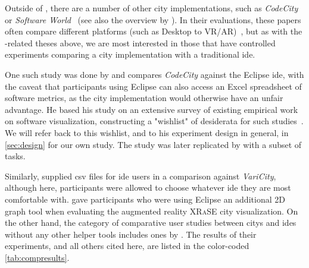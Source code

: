 \documentclass[../thesis]{subfiles}
\begin{document}
Outside of \SEE{}, there are a number of other \gls{city} implementations, such as \emph{CodeCity}~\cite{wettel2007} or \emph{Software World}~\cite{knight2000} (see also the overview by \textcite{jeffery2019}).
In their evaluations, these papers often compare different platforms (such as Desktop to VR/AR)~\cite[\eg,][]{merino2017,fittkau2015, merino2018}, but as with the \SEE{}-related theses above, we are most interested in those that have controlled experiments comparing a \gls{city} implementation with a traditional \gls{ide}.

One such study was done by \textcite{wettel2011} and compares \emph{CodeCity} against the Eclipse \gls{ide}, with the caveat that participants using Eclipse can also access an Excel spreadsheet of software metrics, as the \gls{city} implementation would otherwise have an unfair advantage.
He based his study on an extensive survey of existing empirical work on software visualization, constructing a "wishlist" of desiderata for such studies~\cite[chapter 7]{wettel2011}.
We will refer back to this wishlist, and to his experiment design in general, in \cref{sec:design} for our own study.
The study was later replicated by \textcite{romano2019} with a subset of tasks.

Similarly, \textcite{mortara2024} supplied \gls{csv} files for \gls{ide} users in a comparison against \emph{VariCity}, although here, participants were allowed to choose whatever \gls{ide} they are most comfortable with.
\textcite{mehra2020} gave participants who were using Eclipse an additional 2D graph tool when evaluating the augmented reality \textsc{XRaSE} \gls{city} visualization.
On the other hand, the category of comparative user studies between \glspl{city} and \glspl{ide} without any other helper tools includes ones by \textcite{khaloo2017,galperin2022,lennartkipka2020}.
The results of their experiments, and all others cited here, are listed in the color-coded \cref{tab:compresults}.



\newcommand{\reside}[1]{\cellcolor{Blue}\textcolor{White}{#1}}
\newcommand{\rescc}[1]{\cellcolor{Maroon}\textcolor{White}{#1}}
\newcommand{\residel}[1]{\cellcolor{LightBlue}#1}  %
\newcommand{\resccl}[1]{\cellcolor{LightMaroon}#1}
\newcommand{\resmixed}[1]{\cellcolor{Goldenrod}#1}  %
\newcommand{\resnone}[1]{\cellcolor{Gray!70!white}No diff.}  %
\newcommand{\resna}[1]{\textcolor{Gray}{\textit{N/A}}}
\end{document}
